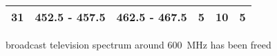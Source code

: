 \begin{table}[]
\begin{tabular}{|c|c|c|c|c|c|}
31                                                          & 452.5 - 457.5                                          & 462.5 - 467.5                                            & 5                                                                    & 10                                                               & 5                                                           \\ \hline
\end{tabular}
\end{table}


broadcast television spectrum around \SI{600}{MHz} has been freed\cite{Samantha2015tunableAntennas}